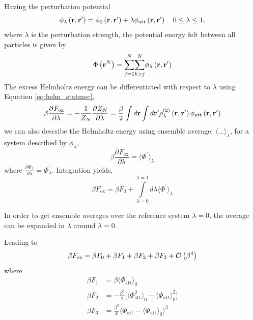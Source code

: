 \documentclass[12pt, letterpaper]{article}
\newcommand*{\pd}[3][]{\frac{\partial^{#1}#2}{\partial{#3}^{#1}}}%
\newcommand*{\lb}{\ensuremath{\left(}}
\newcommand*{\rb}{\ensuremath{\right)}}
\newcommand{\excess}{\ensuremath{\text{ex}}\xspace}
\newcommand{\rvec}{\ensuremath{\mathbf{r}}\xspace}
\newcommand{\attractive}{\ensuremath{\text{att}}\xspace}
\begin{document}
Having the perturbation potential
\begin{equation}
  \phi_\lambda \lb \rvec, \rvec^\prime \rb = \phi_0 \lb \rvec, \rvec^\prime \rb + \lambda \phi_\attractive \lb \rvec, \rvec^\prime \rb \quad 0 \le \lambda \le 1,
\end{equation}
where $\lambda$ is the perturbation strength, the potential energy felt between all particles is given by
\begin{equation}
\Phi \lb \rvec^N \rb = \overset{N}{\underset{j=1}{\sum}} \overset{N}{\underset{k>j}{\sum}} \phi_\lambda \lb \rvec, \rvec^\prime \rb
\end{equation}
The excess Helmholtz energy can be differentiated with respect to $\lambda$ using Equation \eqref{eq:helm_statmec},
\begin{equation}
  \label{eq:helm_expancion}
\beta \pd{F_\excess}{\lambda} = -\frac{1}{Z_N} \pd{Z_N}{\lambda} = \frac{\beta}{2} \int d \rvec \int d \rvec^\prime \rho_\lambda^{(2)}\lb \rvec, \rvec^\prime \rb \phi_\attractive \lb \rvec, \rvec^\prime \rb
\end{equation}
we can also describe the Helmholtz energy using ensemble average, $\langle \dots \rangle_\lambda$, for a system described by $\phi_\lambda$,
\begin{equation}
\beta \pd{F_\excess}{\lambda} = \langle \Phi^\prime \rangle_\lambda
\end{equation}
where $\pd{\Phi_\lambda}{\lambda} = \Phi_\lambda^\prime$. Integration yields,
\begin{equation}
\beta F_\excess = \beta F_0 + \overset{\lambda=1}{\underset{\lambda=0}{\int}} d \lambda \langle \Phi^\prime \rangle_\lambda
\end{equation}

In order to get ensemble averages over the reference system
$\lambda = 0$, the average can be expanded in $\lambda$ around
$\lambda = 0$.

Leading to
\begin{equation}
\beta F_\excess = \beta F_0 + \beta F_1 + \beta F_2 + \beta F_3 + \mathcal{O}\lb \beta^4 \rb
\end{equation}
where
\begin{align}
  \beta F_1 &= \beta \langle \Phi_\attractive  \rangle_0\\
  \beta F_2 &= -\frac{\beta^2}{2} \biggl[ \langle \Phi_\attractive^2  \rangle_0 - \langle \Phi_\attractive  \rangle_0^2 \biggr] \\
  \beta F_3 &= \frac{\beta^3}{3!} \bigg\langle \Phi_\attractive - \langle \Phi_\attractive  \rangle_0 \bigg\rangle^3
\end{align}
\end{document}

